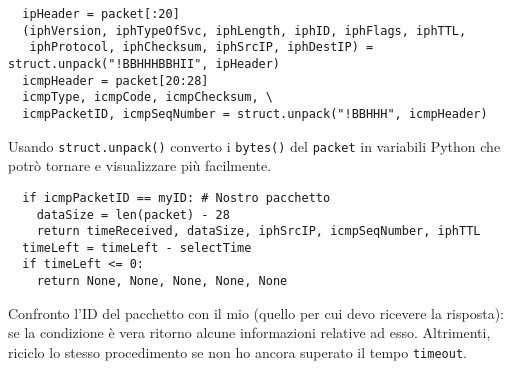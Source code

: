 \documentclass[a4paper,12pt]{report}
\begin{document}
\begin{verbatim}
  ipHeader = packet[:20]
  (iphVersion, iphTypeOfSvc, iphLength, iphID, iphFlags, iphTTL,
   iphProtocol, iphChecksum, iphSrcIP, iphDestIP) = struct.unpack("!BBHHHBBHII", ipHeader)
  icmpHeader = packet[20:28]
  icmpType, icmpCode, icmpChecksum, \
  icmpPacketID, icmpSeqNumber = struct.unpack("!BBHHH", icmpHeader)
\end{verbatim}
Usando \texttt{struct.unpack()} converto i \texttt{bytes()} del \texttt{packet} in variabili Python che potrò tornare e visualizzare più facilmente.
%
\begin{verbatim}
  if icmpPacketID == myID: # Nostro pacchetto
    dataSize = len(packet) - 28
    return timeReceived, dataSize, iphSrcIP, icmpSeqNumber, iphTTL
  timeLeft = timeLeft - selectTime
  if timeLeft <= 0:
    return None, None, None, None, None
\end{verbatim}
Confronto l'ID del pacchetto con il mio (quello per cui devo ricevere la risposta): se la condizione è vera ritorno alcune informazioni relative ad esso.
%
Altrimenti, riciclo lo stesso procedimento se non ho ancora superato il tempo \texttt{timeout}.
\end{document}
